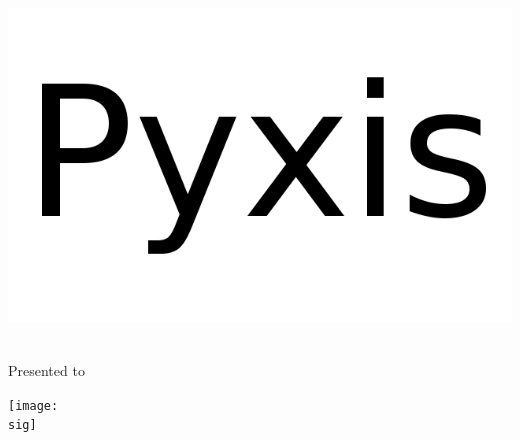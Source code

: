 \documentclass[pdftex,20pt,a4paper] {extarticle}
\begin{document}
\clearpage
\noindent\begin{minipage}{\linewidth}
	\begin{center}	
		\includegraphics[scale=.65]{../img/logo.png}
	\begin{spacing}{2.5}
		{\Huge \titleAward{}}
		\\
		Presented to 
		\\
		{\huge \recName{}}
	\end{spacing}
		\proc{}
	\end{center}
		\begin{minipage}[c]{0.50\textwidth}
			    \center\dateAward{}
		\end{minipage}
	\begin{minipage}[c]{0.5\textwidth}
		\begin{center}
		\begin{spacing}{0.5}
		\texttt{[image: \\sig]}
		\\
		\giveName{}
		\end{spacing}
		\end{center}
	\end{minipage}	
\end{minipage}
\end{document}

